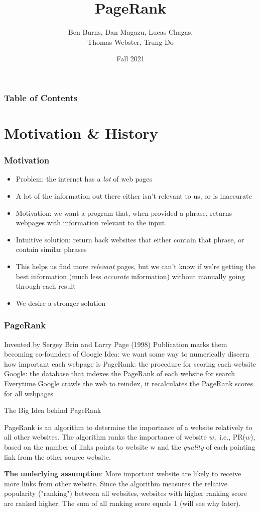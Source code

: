 \documentclass{beamer}
\title{PageRank}
\author{Ben Burns, Dan Magazu, Lucas Chagas, \\Thomas Webster, Trung Do}
\date{Fall 2021}
\begin{document}
\frame{\titlepage}

\begin{frame}
\frametitle{Table of Contents}
\tableofcontents
\end{frame}


\section{Motivation \& History}
\begin{frame}[t]
\frametitle{Motivation}
\begin{itemize}
    \setlength\itemsep{0.5em}
    \item Problem: the internet has a \emph{lot} of web pages
    \item A lot of the information out there either isn't relevant to us, or is inaccurate
    \item Motivation: we want a program that, when provided a phrase, returns webpages with information relevant to the input
    \item Intuitive solution: return back websites that either contain that phrase, or contain similar phrases
    \item This helps us find more \emph{relevant} pages, but we can't know if we're getting the best information (much less \emph{accurate} information) without manually going through each result
    \item We desire a stronger solution
\end{itemize}
\end{frame}

\begin{frame}[t]
\frametitle{PageRank}
\begin{outline}
    \1 Invented by Sergey Brin and Larry Page (1998)\footnotemark 
        \2 Publication marks them becoming co-founders of Google  
    \1 Idea: we want some way to numerically discern how important each webpage is
    \1 PageRank: the procedure for scoring each website
    \1 Google: the database that indexes the PageRank of each website for search
    \1 Everytime Google crawls the web to reindex, it recalculates the PageRank scores for all webpages
\end{outline}
\end{frame}

\begin{frame}[t]{The Big Idea behind PageRank}
\begin{outline}
    \1 PageRank is an algorithm to determine the importance of a website relatively to all other websites. The algorithm ranks the importance of website $w,$ i.e., PR($w$), based on the number of links points to website w and the \emph{quality} of each pointing link from the other source website. 

    \1 \textbf{The underlying assumption}: More important website are likely to receive more links from other website. Since the algorithm measures the relative popularity ("ranking") between all websites, websites with higher ranking score are ranked higher. The sum of all ranking score equals 1 (will see why later).
\end{outline}
\end{frame}
\end{document}
